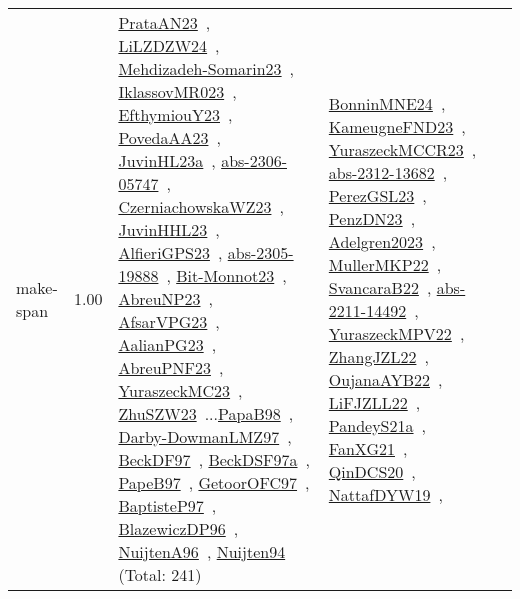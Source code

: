 {\begin{longtable}{p{3cm}r>{\raggedright\arraybackslash}p{6cm}>{\raggedright\arraybackslash}p{6cm}>{\raggedright\arraybackslash}p{8cm}}
\index{make-span}\index{Concepts!make-span}make-span &  1.00 & \href{../works/PrataAN23.pdf}{PrataAN23}~\cite{PrataAN23}, \href{../works/LiLZDZW24.pdf}{LiLZDZW24}~\cite{LiLZDZW24}, \href{../works/Mehdizadeh-Somarin23.pdf}{Mehdizadeh-Somarin23}~\cite{Mehdizadeh-Somarin23}, \href{../works/IklassovMR023.pdf}{IklassovMR023}~\cite{IklassovMR023}, \href{../works/EfthymiouY23.pdf}{EfthymiouY23}~\cite{EfthymiouY23}, \href{../works/PovedaAA23.pdf}{PovedaAA23}~\cite{PovedaAA23}, \href{../works/JuvinHL23a.pdf}{JuvinHL23a}~\cite{JuvinHL23a}, \href{../works/abs-2306-05747.pdf}{abs-2306-05747}~\cite{abs-2306-05747}, \href{../works/CzerniachowskaWZ23.pdf}{CzerniachowskaWZ23}~\cite{CzerniachowskaWZ23}, \href{../works/JuvinHHL23.pdf}{JuvinHHL23}~\cite{JuvinHHL23}, \href{../works/AlfieriGPS23.pdf}{AlfieriGPS23}~\cite{AlfieriGPS23}, \href{../works/abs-2305-19888.pdf}{abs-2305-19888}~\cite{abs-2305-19888}, \href{../works/Bit-Monnot23.pdf}{Bit-Monnot23}~\cite{Bit-Monnot23}, \href{../works/AbreuNP23.pdf}{AbreuNP23}~\cite{AbreuNP23}, \href{../works/AfsarVPG23.pdf}{AfsarVPG23}~\cite{AfsarVPG23}, \href{../works/AalianPG23.pdf}{AalianPG23}~\cite{AalianPG23}, \href{../works/AbreuPNF23.pdf}{AbreuPNF23}~\cite{AbreuPNF23}, \href{../works/YuraszeckMC23.pdf}{YuraszeckMC23}~\cite{YuraszeckMC23}, \href{../works/ZhuSZW23.pdf}{ZhuSZW23}~\cite{ZhuSZW23}...\href{../works/PapaB98.pdf}{PapaB98}~\cite{PapaB98}, \href{../works/Darby-DowmanLMZ97.pdf}{Darby-DowmanLMZ97}~\cite{Darby-DowmanLMZ97}, \href{../works/BeckDF97.pdf}{BeckDF97}~\cite{BeckDF97}, \href{../works/BeckDSF97a.pdf}{BeckDSF97a}~\cite{BeckDSF97a}, \href{../works/PapeB97.pdf}{PapeB97}~\cite{PapeB97}, \href{../works/GetoorOFC97.pdf}{GetoorOFC97}~\cite{GetoorOFC97}, \href{../works/BaptisteP97.pdf}{BaptisteP97}~\cite{BaptisteP97}, \href{../works/BlazewiczDP96.pdf}{BlazewiczDP96}~\cite{BlazewiczDP96}, \href{../works/NuijtenA96.pdf}{NuijtenA96}~\cite{NuijtenA96}, \href{../works/Nuijten94.pdf}{Nuijten94}~\cite{Nuijten94} (Total: 241) & \href{../works/BonninMNE24.pdf}{BonninMNE24}~\cite{BonninMNE24}, \href{../works/KameugneFND23.pdf}{KameugneFND23}~\cite{KameugneFND23}, \href{../works/YuraszeckMCCR23.pdf}{YuraszeckMCCR23}~\cite{YuraszeckMCCR23}, \href{../works/abs-2312-13682.pdf}{abs-2312-13682}~\cite{abs-2312-13682}, \href{../works/PerezGSL23.pdf}{PerezGSL23}~\cite{PerezGSL23}, \href{../works/PenzDN23.pdf}{PenzDN23}~\cite{PenzDN23}, \href{../works/Adelgren2023.pdf}{Adelgren2023}~\cite{Adelgren2023}, \href{../works/MullerMKP22.pdf}{MullerMKP22}~\cite{MullerMKP22}, \href{../works/SvancaraB22.pdf}{SvancaraB22}~\cite{SvancaraB22}, \href{../works/abs-2211-14492.pdf}{abs-2211-14492}~\cite{abs-2211-14492}, \href{../works/YuraszeckMPV22.pdf}{YuraszeckMPV22}~\cite{YuraszeckMPV22}, \href{../works/ZhangJZL22.pdf}{ZhangJZL22}~\cite{ZhangJZL22}, \href{../works/OujanaAYB22.pdf}{OujanaAYB22}~\cite{OujanaAYB22}, \href{../works/LiFJZLL22.pdf}{LiFJZLL22}~\cite{LiFJZLL22}, \href{../works/PandeyS21a.pdf}{PandeyS21a}~\cite{PandeyS21a}, \href{../works/FanXG21.pdf}{FanXG21}~\cite{FanXG21}, \href{../works/QinDCS20.pdf}{QinDCS20}~\cite{QinDCS20}, \href{../works/NattafDYW19.pdf}{NattafDYW19}~\cite{NattafDYW19}, 
\end{longtable}}
